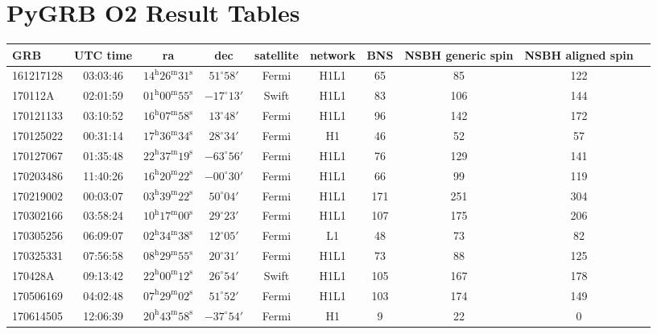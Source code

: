 \documentclass[11pt]{cuthesis}
\begin{document}
\section{PyGRB O2 Result Tables} \label{tab:grbs}
\begin{landscape}
\begin{tabular}{l c  c  c  c  c  c  c  c c |}
\hline
 GRB & UTC time & ra & dec & satellite & network & BNS & NSBH generic spin & NSBH aligned spin \\
\hline
161217128 & 03:03:46  & $14^{\mathrm{h}}26^{\mathrm{m}}31^{\mathrm{s}}$ & $51^{\circ}58'$ &  Fermi   & H1L1   & 65  & 85  & 122 \\
170112A   & 02:01:59  & $01^{\mathrm{h}}00^{\mathrm{m}}55^{\mathrm{s}}$ & $-17^{\circ}13'$ & Swift   & H1L1   & 83  & 106 & 144 \\
170121133 & 03:10:52  & $16^{\mathrm{h}}07^{\mathrm{m}}58^{\mathrm{s}}$ & $13^{\circ}48'$ &  Fermi   & H1L1   & 96  & 142 & 172 \\
170125022 & 00:31:14  & $17^{\mathrm{h}}36^{\mathrm{m}}34^{\mathrm{s}}$ & $28^{\circ}34'$ &  Fermi   & H1     & 46  & 52  & 57 \\
170127067 & 01:35:48  & $22^{\mathrm{h}}37^{\mathrm{m}}19^{\mathrm{s}}$ & $-63^{\circ}56'$ & Fermi   & H1L1   & 76  & 129 & 141 \\
170203486 & 11:40:26  & $16^{\mathrm{h}}20^{\mathrm{m}}22^{\mathrm{s}}$ & $-00^{\circ}30'$ & Fermi   & H1L1   & 66  & 99  & 119 \\
170219002 & 00:03:07  & $03^{\mathrm{h}}39^{\mathrm{m}}22^{\mathrm{s}}$ & $50^{\circ}04'$ &  Fermi   & H1L1   & 171 & 251 & 304 \\
170302166 & 03:58:24  & $10^{\mathrm{h}}17^{\mathrm{m}}00^{\mathrm{s}}$ & $29^{\circ}23'$ &  Fermi   & H1L1   & 107 & 175 & 206 \\
170305256 & 06:09:07  & $02^{\mathrm{h}}34^{\mathrm{m}}38^{\mathrm{s}}$ & $12^{\circ}05'$ &  Fermi   & L1     & 48  & 73  & 82 \\
170325331 & 07:56:58  & $08^{\mathrm{h}}29^{\mathrm{m}}55^{\mathrm{s}}$ & $20^{\circ}31'$ &  Fermi   & H1L1   & 73  & 88  & 125 \\
170428A   & 09:13:42  & $22^{\mathrm{h}}00^{\mathrm{m}}12^{\mathrm{s}}$ & $26^{\circ}54'$ &  Swift   & H1L1   & 105 & 167 & 178 \\
170506169 & 04:02:48  & $07^{\mathrm{h}}29^{\mathrm{m}}02^{\mathrm{s}}$ & $51^{\circ}52'$ &  Fermi   & H1L1   & 103 & 174 & 149 \\
170614505 & 12:06:39  & $20^{\mathrm{h}}43^{\mathrm{m}}58^{\mathrm{s}}$ & $-37^{\circ}54'$ & Fermi   & H1     & 9   & 22  & 0 \\

\end{tabular}
\end{landscape}
\end{document}
